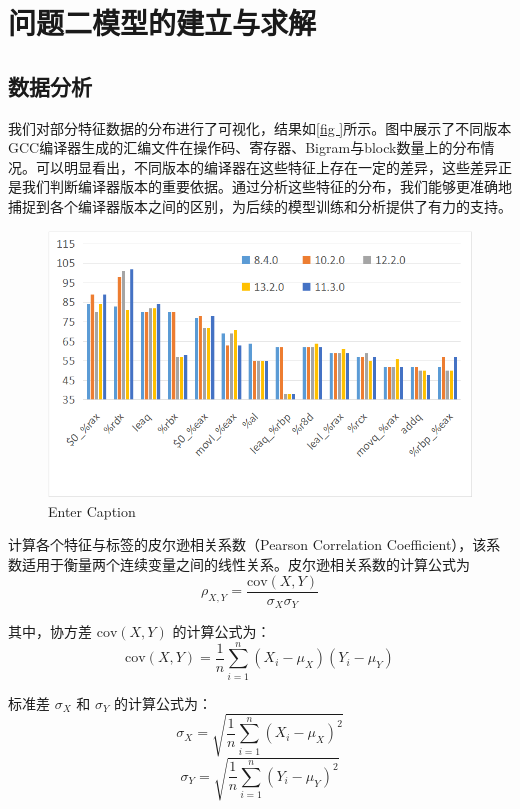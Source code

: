 \section{问题二模型的建立与求解}
\subsection{数据分析}
我们对部分特征数据的分布进行了可视化，结果如\autoref{fig
}所示。图中展示了不同版本GCC编译器生成的汇编文件在操作码、寄存器、Bigram与block数量上的分布情况。可以明显看出，不同版本的编译器在这些特征上存在一定的差异，这些差异正是我们判断编译器版本的重要依据。通过分析这些特征的分布，我们能够更准确地捕捉到各个编译器版本之间的区别，为后续的模型训练和分析提供了有力的支持。
\begin{figure}[H]
	\centering
	\includegraphics[width=1\linewidth]{figures/hist.png}
	\caption{Enter Caption}
	\label{fig:hist}
\end{figure}


计算各个特征与标签的皮尔逊相关系数（Pearson Correlation Coefficient），该系数适用于衡量两个连续变量之间的线性关系。皮尔逊相关系数的计算公式为
\begin{equation}
	\rho_{X,Y} = \frac{\text{cov}(X, Y)}{\sigma_X \sigma_Y}
	\label{eq:correlation}
\end{equation}

其中，协方差 \(\text{cov}(X, Y)\) 的计算公式为：
\begin{equation}
	\text{cov}(X, Y) = \frac{1}{n} \sum_{i=1}^{n} (X_i - \mu_X)(Y_i - \mu_Y)
	\label{eq:covariance}
\end{equation}

标准差 \(\sigma_X\) 和 \(\sigma_Y\) 的计算公式为：
\begin{equation}
	\sigma_X = \sqrt{\frac{1}{n} \sum_{i=1}^{n} (X_i - \mu_X)^2}
	\label{eq:stddev_x}
\end{equation}
\begin{equation}
	\sigma_Y = \sqrt{\frac{1}{n} \sum_{i=1}^{n} (Y_i - \mu_Y)^2}
	\label{eq:stddev_y}
\end{equation}

